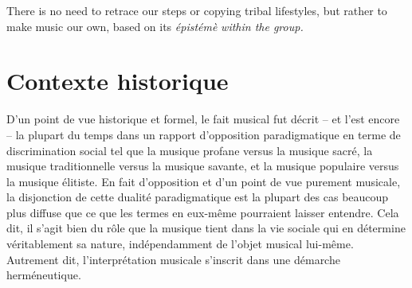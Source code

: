 \documentclass{article}
\begin{document}
{There is no need to retrace our steps or copying tribal lifestyles, but rather to make music our own, based on its} \textsl{épistémè} 
\textit{within the group.}

\bigskip

%    
  
\section{Contexte historique}

D'un point de vue historique et formel, le fait musical fut décrit -- et l'est encore -- la plupart du temps dans un rapport  d'opposition paradigmatique en terme de discrimination social tel que la musique profane versus la musique sacré, la musique traditionnelle versus la musique savante, et la musique populaire versus la musique élitiste.
En fait d’opposition et d’un point de vue purement musicale, la disjonction
de cette dualité paradigmatique est la plupart des cas beaucoup plus diffuse que ce que les
termes en eux-même pourraient laisser entendre. Cela dit, il s’agit bien du rôle
que la musique tient dans la vie sociale qui en détermine véritablement sa nature,
indépendamment de l’objet musical lui-même. Autrement dit, l’interprétation
musicale s’inscrit dans une démarche herméneutique.
\end{document}
